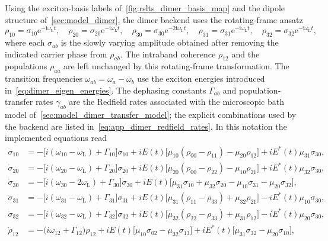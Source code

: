 Using the exciton-basis labels of~\autoref{fig:rslts_dimer_basis_map} and
the dipole structure of~\autoref{sec:model_dimer}, the dimer backend uses
the rotating-frame ansatz
\begin{equation*}
    \rho_{10}=\sigma_{10}\mathrm{e}^{-\mathrm{i}\omega_{\mathrm{L}} t},
    \quad
    \rho_{20}=\sigma_{20}\mathrm{e}^{-\mathrm{i}\omega_{\mathrm{L}} t},
    \quad
    \rho_{30}=\sigma_{30}\mathrm{e}^{-2\mathrm{i}\omega_{\mathrm{L}} t},
    \quad
    \rho_{31}=\sigma_{31}\mathrm{e}^{-\mathrm{i}\omega_{\mathrm{L}} t},
    \quad
    \rho_{32}=\sigma_{32}\mathrm{e}^{-\mathrm{i}\omega_{\mathrm{L}} t},
\end{equation*}
where each \(\sigma_{ab}\) is the slowly varying amplitude obtained after
removing the indicated carrier phase from \(\rho_{ab}\). The intraband
coherence \(\rho_{12}\) and the populations \(\rho_{aa}\) are left unchanged
by this rotating-frame transformation. The transition frequencies
\(\omega_{ab}=\omega_a-\omega_b\) use the exciton energies introduced
in~\autoref{eq:dimer_eigen_energies}. The dephasing constants \(\Gamma_{ab}\)
and population-transfer rates \(\gamma_{ab}\) are the Redfield rates associated
with the microscopic bath model of~\autoref{sec:model_dimer_transfer_model};
the explicit combinations used by the backend are listed
in~\autoref{eq:app_dimer_redfield_rates}. In this notation the implemented
equations read
\begin{align*}
\dot{\sigma}_{10}
&=
-\bigl[i(\omega_{10}-\omega_{\mathrm{L}})+\Gamma_{10}\bigr]\sigma_{10}
+ iE(t)\bigl[\mu_{10}(\rho_{00}-\rho_{11})-\mu_{20}\rho_{12}\bigr]
+ iE^{*}(t)\mu_{31}\sigma_{30},
\\
\dot{\sigma}_{20}
&=
-\bigl[i(\omega_{20}-\omega_{\mathrm{L}})+\Gamma_{20}\bigr]\sigma_{20}
+ iE(t)\bigl[\mu_{20}(\rho_{00}-\rho_{22})-\mu_{10}\rho_{21}\bigr]
+ iE^{*}(t)\mu_{32}\sigma_{30},
\\
\dot{\sigma}_{30}
&=
-\bigl[i(\omega_{30}-2\omega_{\mathrm{L}})+\Gamma_{30}\bigr]\sigma_{30}
+ iE(t)\bigl[\mu_{31}\sigma_{10}+\mu_{32}\sigma_{20}
- \mu_{10}\sigma_{31}-\mu_{20}\sigma_{32}\bigr],
\end{align*}
\begin{align*}
\dot{\sigma}_{31}
&=
-\bigl[i(\omega_{31}-\omega_{\mathrm{L}})+\Gamma_{31}\bigr]\sigma_{31}
+ iE(t)\bigl[\mu_{31}(\rho_{11}-\rho_{33})+\mu_{32}\rho_{21}\bigr]
- iE^{*}(t)\mu_{10}\sigma_{30},
\\
\dot{\sigma}_{32}
&=
-\bigl[i(\omega_{32}-\omega_{\mathrm{L}})+\Gamma_{32}\bigr]\sigma_{32}
+ iE(t)\bigl[\mu_{32}(\rho_{22}-\rho_{33})+\mu_{31}\rho_{12}\bigr]
- iE^{*}(t)\mu_{20}\sigma_{30},
\\
\dot{\rho}_{12}
&=
-\bigl(i\omega_{12}+\Gamma_{12}\bigr)\rho_{12}
+ iE(t)\bigl[\mu_{10}\sigma_{02}-\mu_{32}\sigma_{13}\bigr]
+ iE^{*}(t)\bigl[\mu_{31}\sigma_{32}-\mu_{20}\sigma_{10}\bigr],
\end{align*}
